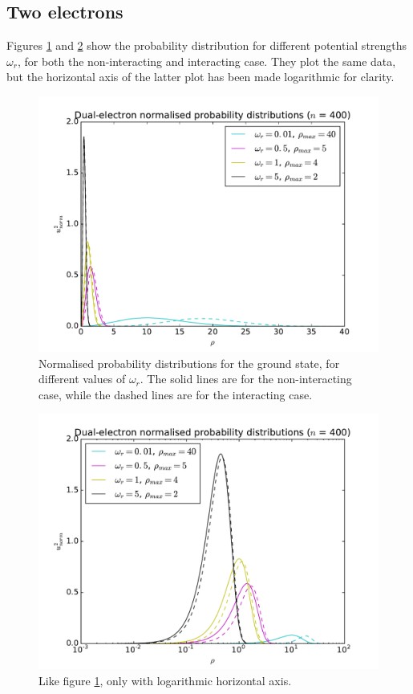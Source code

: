 \documentclass{article}
\begin{document}
\FloatBarrier
\subsection{Two electrons} \label{section:twoe}
Figures \ref{fig:delprob} and \ref{fig:delprob2} show the probability distribution for different potential strengths $\omega_r$, for both the non-interacting and interacting case. They plot the same data, but the horizontal axis of the latter plot has been made logarithmic for clarity.\\
\begin{figure}[!h]
	\centering
	\includegraphics[width=\linewidth]{dual_electron_norm_probs.pdf}
	\caption{Normalised probability distributions for the ground state, for different values of $\omega_r$. The solid lines are for the non-interacting case, while the dashed lines are for the interacting case.}
	\label{fig:delprob}
\end{figure}
\begin{figure}[!h]
	\centering
	\includegraphics[width=\linewidth]{dual_electron_norm_probs2.pdf}
	\caption{Like figure \ref{fig:delprob}, only with logarithmic horizontal axis.}
	\label{fig:delprob2}
\end{figure}\\
\end{document}
